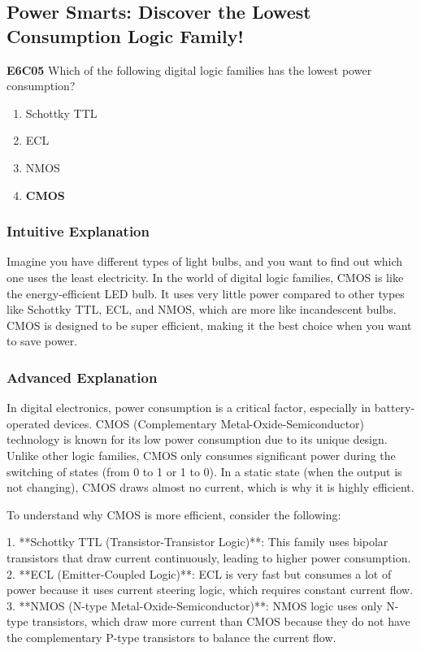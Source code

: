 \subsection{Power Smarts: Discover the Lowest Consumption Logic Family!}

\begin{tcolorbox}[colback=gray!10!white,colframe=black!75!black,title=Multiple Choice Question]
\textbf{E6C05} Which of the following digital logic families has the lowest power consumption?

\begin{enumerate}[label=\Alph*)]
    \item Schottky TTL
    \item ECL
    \item NMOS
    \item \textbf{CMOS}
\end{enumerate}
\end{tcolorbox}

\subsubsection*{Intuitive Explanation}
Imagine you have different types of light bulbs, and you want to find out which one uses the least electricity. In the world of digital logic families, CMOS is like the energy-efficient LED bulb. It uses very little power compared to other types like Schottky TTL, ECL, and NMOS, which are more like incandescent bulbs. CMOS is designed to be super efficient, making it the best choice when you want to save power.

\subsubsection*{Advanced Explanation}
In digital electronics, power consumption is a critical factor, especially in battery-operated devices. CMOS (Complementary Metal-Oxide-Semiconductor) technology is known for its low power consumption due to its unique design. Unlike other logic families, CMOS only consumes significant power during the switching of states (from 0 to 1 or 1 to 0). In a static state (when the output is not changing), CMOS draws almost no current, which is why it is highly efficient.

To understand why CMOS is more efficient, consider the following:

1. **Schottky TTL (Transistor-Transistor Logic)**: This family uses bipolar transistors that draw current continuously, leading to higher power consumption.
2. **ECL (Emitter-Coupled Logic)**: ECL is very fast but consumes a lot of power because it uses current steering logic, which requires constant current flow.
3. **NMOS (N-type Metal-Oxide-Semiconductor)**: NMOS logic uses only N-type transistors, which draw more current than CMOS because they do not have the complementary P-type transistors to balance the current flow.

